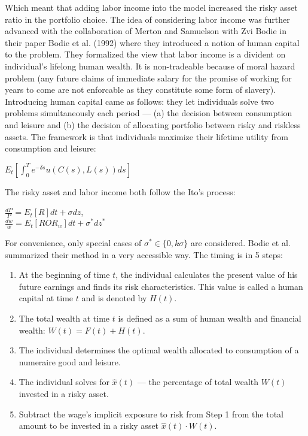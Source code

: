 Which meant that adding labor income into the model increased the risky asset ratio in the portfolio choice. The idea of considering labor income was further advanced with the collaboration of Merton and Samuelson with Zvi Bodie in their paper Bodie et al. (1992) where they introduced a notion of human capital to the problem. They formalized the view that labor income is a divident on individual's lifelong human wealth. It is non-tradeable because of moral hazard problem (any future claims of immediate salary for the promise of working for years to come are not enforcable as they constitute some form of slavery). Introducing human capital came as follows: they let individuals solve two problems simultaneously each period --- (a) the decision between consumption and leisure and (b) the decision of allocating portfolio between risky and riskless assets. The framework is that individuals maximize their lifetime utility from consumption and leisure:

\begin{center}
	$E_t \left[\displaystyle\int_0^T e^{-\delta s} u(C(s), L(s))ds \right]$
\end{center}

The risky asset and labor income both follow the Ito's process:

\begin{center}
	$\frac{dP}{P} = E_t[R]dt + \sigma dz$,\\
	$\frac{dw}{w} = E_t[ROR_w]dt + \sigma^* dz^*$
\end{center}

For convenience, only special cases of $\sigma^* \in \{0, k\sigma \}$ are considered. Bodie et al. summarized their method in a very accessible way. The timing is in 5 steps:

\begin{enumerate}
	\item At the beginning of time $t$, the individual calculates the present value of his future earnings and finds its risk characteristics. This value is called a human capital at time $t$ and is denoted by $H(t)$.
	\item The total wealth at time $t$ is defined as a sum of human wealth and financial wealth: $W(t) = F(t) + H(t)$.
	\item The individual determines the optimal wealth allocated to consumption of a numeraire good and leisure.
	\item The individual solves for $\hat{x}(t)$ --- the percentage of total wealth $W(t)$ invested in a risky asset.
	\item Subtract the wage's implicit exposure to risk from Step 1 from the total amount to be invested in a risky asset $\hat{x}(t) \cdot W(t)$.
\end{enumerate}


